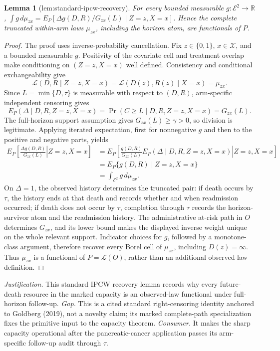 \documentclass{article}
\newtheorem{lemma}{Lemma}
\begin{document}
\begin{lemma}[lem:standard-ipcw-recovery]\label{lem:standard-ipcw-recovery}
For every bounded measurable \(g:\mathcal E^2\to\mathbb R\), \(\int g\,d\mu_{zx}=E_P[\Delta g(D,R)/G_{zx}(L)\mid Z=z,X=x]\). Hence the complete truncated within-arm laws \(\mu_{zx}\), including the horizon atom, are functionals of \(P\).
\end{lemma}
\begin{proof}
The proof uses inverse-probability cancellation.  Fix \(z\in\{0,1\}\), \(x\in\mathcal X\), and a bounded measurable \(g\).  Positivity of the covariate cell and treatment overlap make conditioning on \((Z=z,X=x)\) well defined.  Consistency and conditional exchangeability give
\[
 \mathcal L(D,R\mid Z=z,X=x)=\mathcal L(D(z),R(z)\mid X=x)=\mu_{zx}.
\]
Since \(L=\min\{D,\tau\}\) is measurable with respect to \((D,R)\), arm-specific independent censoring gives
\[
 E_P(\Delta\mid D,R,Z=z,X=x)
 =\Pr(C\ge L\mid D,R,Z=z,X=x)=G_{zx}(L).
\]
The full-horizon support assumption gives \(G_{zx}(L)\ge\gamma>0\), so division is legitimate.  Applying iterated expectation, first for nonnegative \(g\) and then to the positive and negative parts, yields
\[
 \begin{aligned}
 E_P\!\left[\left.\frac{\Delta g(D,R)}{G_{zx}(L)}\right|Z=z,X=x\right]
 &=E_P\!\left[\left.
   \frac{g(D,R)}{G_{zx}(L)}E_P(\Delta\mid D,R,Z=z,X=x)
   \right|Z=z,X=x\right]\\
 &=E_P\{g(D,R)\mid Z=z,X=x\}\\
 &=\int_{\mathcal E^2}g\,d\mu_{zx}.
 \end{aligned}
\]
On \(\Delta=1\), the observed history determines the truncated pair: if death occurs by \(\tau\), the history ends at that death and records whether and when readmission occurred; if death does not occur by \(\tau\), completion through \(\tau\) records the horizon-survivor atom and the readmission history.  The administrative at-risk path in \(O\) determines \(G_{zx}\), and its lower bound makes the displayed inverse weight unique on the whole relevant support.  Indicator choices for \(g\), followed by a monotone-class argument, therefore recover every Borel cell of \(\mu_{zx}\), including \(D(z)=\infty\).  Thus \(\mu_{zx}\) is a functional of \(P=\mathcal L(O)\), rather than an additional observed-law definition.
\end{proof}
\par\smallskip\noindent \textit{Justification.} This standard IPCW recovery lemma records why every future-death resource in the marked capacity is an observed-law functional under full-horizon follow-up. \textit{Gap.} This is a cited standard right-censoring identity anchored to Goldberg (2019), not a novelty claim; its marked complete-path specialization fixes the primitive input to the capacity theorem. \textit{Consumer.} It makes the sharp capacity operational after the pancreatic-cancer application passes its arm-specific follow-up audit through \(\tau\).
\end{document}
